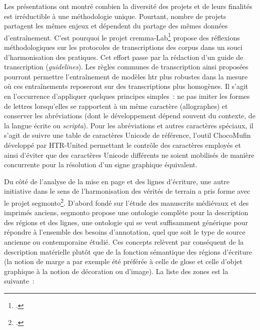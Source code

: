 \documentclass[a4paper,12pt,twoside]{book}
\begin{document}
				Les présentations ont montré combien la diversité des projets et de
				leurs finalités est irréductible à une méthodologie unique. Pourtant,
				nombre de projets partagent les mêmes enjeux et dépendent du partage des
				mêmes données d'entraînement. C'est pourquoi le projet \gls{cremma}-Lab\footcite{campsCremmaLabProjectsTranscription2022} propose des réflexions
				méthodologiques sur les protocoles de transcriptions des corpus dans un
				souci d'harmonisation des pratiques. Cet effort passe par la rédaction
				d'un guide de transcription (\textit{guidelines}). Les règles communes de
				transcription ainsi proposées pourront permettre l'entraînement de
				modèles \gls{htr} plus robustes dans la mesure où ces entraînements reposeront
				sur des transcriptions plus homogènes. Il s'agit en l'occurrence
				d'appliquer quelques principes simples~: ne pas imiter les formes de
				lettres lorsqu'elles se rapportent à un même caractère (allographes) et
				conserver les abréviations (dont le développement dépend souvent du
				contexte, de la langue écrite ou \textit{scripta}). Pour les abréviations
				et autres caractères spéciaux, il s'agit de suivre une table de
				caractères Unicode de référence, l'outil ChocoMufin développé par
				HTR-United permettant le contrôle des caractères employés et ainsi
				d'éviter que des caractères Unicode différents ne soient mobilisés de
				manière concurrente pour la résolution d'un signe graphique équivalent.
				
				Du côté de l'analyse de la mise en page et des lignes d'écriture, une
				autre initiative dans le sens de l'harmonisation des vérités de terrain
				a pris forme avec le projet \gls{segmonto}\footcite{gabaySegmOntoControlledVocabulary2022}. D'abord fondé sur l'étude
				des manuscrits médiévaux et des imprimés anciens, \gls{segmonto} propose une
				ontologie complète pour la description des régions et des lignes, une ontologie qui se
				veut suffisamment générique pour répondre à l'ensemble des besoins
				d'annotation, quel que soit le type de source ancienne ou contemporaine
				étudié. Ces concepts relèvent par conséquent de la description
				matérielle plutôt que de la fonction sémantique des régions d'écriture
				(la notion de \og marge \fg{} a par exemple été préférée à celle de glose et
				celle d'objet \og graphique\fg{} à la notion de décoration ou d'image). La liste des zones est la suivante~:
				
\end{document}
